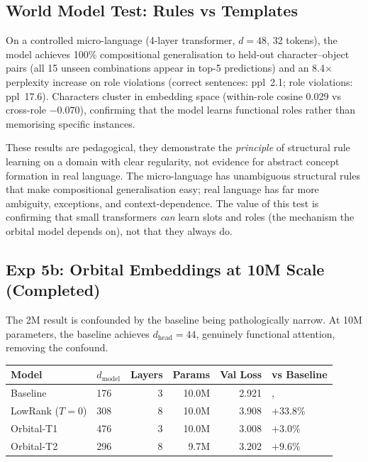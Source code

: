 \documentclass[11pt, a4paper]{article}
\theoremstyle{remark}
\begin{document}
\subsection{World Model Test: Rules vs Templates}

On a controlled micro-language (4-layer transformer, $d{=}48$, 32 tokens), the model achieves 100\% compositional generalisation to held-out character--object pairs (all 15 unseen combinations appear in top-5 predictions) and an 8.4$\times$ perplexity increase on role violations (correct sentences: ppl~2.1; role violations: ppl~17.6).
Characters cluster in embedding space (within-role cosine 0.029 vs cross-role $-0.070$), confirming that the model learns functional roles rather than memorising specific instances.

These results are pedagogical, they demonstrate the \emph{principle} of structural rule learning on a domain with clear regularity, not evidence for abstract concept formation in real language.
The micro-language has unambiguous structural rules that make compositional generalisation easy; real language has far more ambiguity, exceptions, and context-dependence.
The value of this test is confirming that small transformers \emph{can} learn slots and roles (the mechanism the orbital model depends on), not that they always do.

\subsection{Exp 5b: Orbital Embeddings at 10M Scale (Completed)}

The 2M result is confounded by the baseline being pathologically narrow.
At 10M parameters, the baseline achieves $d_{\text{head}} = 44$, genuinely functional attention, removing the confound.

\begin{center}\small
\renewcommand{\arraystretch}{1.2}
\begin{tabular}{llrrrl}
\toprule
\textbf{Model} & $d_{\text{model}}$ & \textbf{Layers} & \textbf{Params} & \textbf{Val Loss} & \textbf{vs Baseline} \\
\midrule
Baseline & 176 & 3 & 10.0M & 2.921 & ,  \\
LowRank ($T{=}0$) & 308 & 8 & 10.0M & 3.908 & $+33.8\%$ \\
Orbital-T1 & 476 & 3 & 10.0M & 3.008 & $+3.0\%$ \\
Orbital-T2 & 296 & 8 & 9.7M & 3.202 & $+9.6\%$ \\
\bottomrule
\end{tabular}
\end{center}
\end{document}
